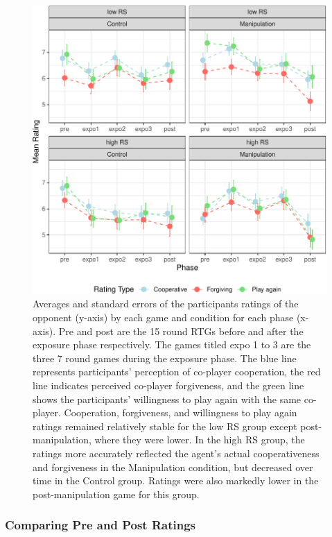 \documentclass[
]{article}
\begin{document}
\begin{figure}[H]

{\centering \includegraphics[width=\textwidth]{article_files/figure-latex/plotRatings-1} 

}

\caption{Averages and standard errors of the participants ratings of the opponent (y-axis) by each game and condition for each phase (x-axis). Pre and post are the 15 round RTGs before and after the exposure phase respectively. The games titled expo 1 to 3 are the three 7 round games during the exposure phase. The blue line represents participants' perception of co-player cooperation, the red line indicates perceived co-player forgiveness, and the green line shows the participants' willingness to play again with the same co-player. Cooperation, forgiveness, and willingness to play again ratings remained relatively stable for the low RS group except post-manipulation, where they were lower. In the high RS group, the ratings more accurately reflected the agent's actual cooperativeness and forgiveness in the Manipulation condition, but decreased over time in the Control group. Ratings were also markedly lower in the post-manipulation game for this group.}\label{fig:plotRatings}
\end{figure}

\subsubsection{Comparing Pre and Post Ratings}\label{comparing-pre-and-post-ratings}
\end{document}
